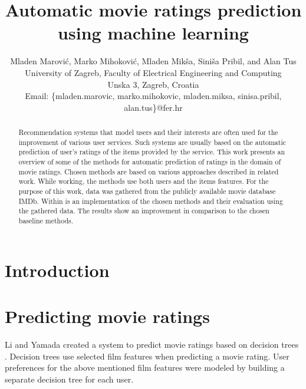 \documentclass[conference,a4paper]{IEEEtran}
\begin{document}
\title{Automatic movie ratings prediction using machine learning}

\author{
Mladen Marovi\'{c}, Marko Mihokovi\'{c}, Mladen Mik\v{s}a,
Sini\v{s}a Pribil, and Alan Tus\\ 
University of Zagreb, Faculty of Electrical Engineering
and Computing\\ 
Unska 3, Zagreb, Croatia\\
Email: \{mladen.marovic, marko.mihokovic, mladen.miksa,
sinisa.pribil, alan.tus\}@fer.hr\\
}

\maketitle

\begin{abstract}
Recommendation systems that model users and their interests are often used for
the improvement of various user services. Such systems are usually based on
the automatic prediction of user's ratings of the items provided by the
service. This work presents an overview of some of the methods for automatic
prediction of ratings in the domain of movie ratings. Chosen methods are based on
various approaches described in related work. While working, the methods use both
users and the items features. For the purpose of this work, data was gathered
from the publicly available movie database IMDb. Within is an implementation of
the chosen methods and their evaluation using the gathered data. The results show
an improvement in comparison to the chosen baseline methods.
\end{abstract}

\IEEEpeerreviewmaketitle



\section{Introduction}

\section{Predicting movie ratings}

Li and Yamada created a system to predict movie ratings based on decision trees
\cite{li2005movie}. Decision trees use selected film features when predicting a
movie rating. User preferences for the above mentioned film features were modeled
by building a separate decision tree for each user.
\end{document}
